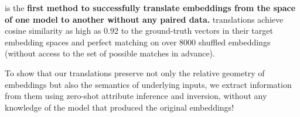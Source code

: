 \atk{} is the
\textbf{first method to successfully translate embeddings from the space of one model to another without any paired data.}
\atk{}
translations achieve cosine similarity as high as $0.92$ to the ground-truth vectors in their target embedding spaces and perfect matching on over $8000$ shuffled embeddings (without access to the set of possible matches in advance). 

To show that our translations preserve not only the relative geometry of embeddings but also the semantics of underlying inputs, we extract information from them using zero-shot attribute inference and inversion, without any knowledge of the model that produced the original embeddings!



